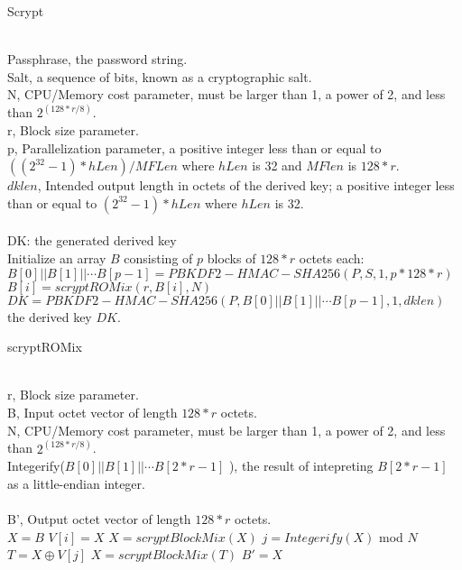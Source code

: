 \begin{algorithm}[tbp]\footnotesize
\caption{Scrypt}
\label{Scrypt}
  	\begin{algorithmic}[1]
	    \REQUIRE ~~\\ 
	    Passphrase, the password string.\\
		Salt, a sequence of bits, known as a cryptographic salt.\\
		N, CPU/Memory cost parameter, must be larger than 1, a power of 2,
		 and less than $2^{(128 * r / 8)}$.\\
		r, Block size parameter.\\
		p, Parallelization parameter, a positive integer less than or equal 
		to $((2^{32}-1) * hLen) / MFLen$ where $hLen$ is 32 and $MFlen$ is $128 * r$.\\
		$dklen$, Intended output length in octets of the derived key; 
		a positive integer less than or equal to $(2^{32} - 1) * hLen$ where $hLen$ is 32.\\
	    \ENSURE ~~\\
	    DK: the generated derived key\\
	    \STATE Initialize an array $B$ consisting of $p$ blocks of $128 * r$ octets each:\\
			$B[0]||B[1]||\cdots B[p-1]=PBKDF2-HMAC-SHA256(P,S,1,p*128*r)$
			\STATE $B[i]= scryptROMix(r,B[i],N)$   
		\ENDFOR 
		\STATE $DK=PBKDF2-HMAC-SHA256(P,B[0]||B[1]||\cdots B[p-1],1,dklen)$
		\RETURN the derived key $DK$.		
    \end{algorithmic}
\end{algorithm}
 
\begin{algorithm}[tbp]\footnotesize
\caption{scryptROMix}
\label{scryptROMix}
  	\begin{algorithmic}[1]
	    \REQUIRE ~~\\ 
	    r, Block size parameter.\\
		B, Input octet vector of length $128 * r$ octets.\\
		N, CPU/Memory cost parameter, must be larger than 1,
		 a power of 2, and less than $2^{(128 * r / 8)}$.\\
		Integerify($B[0]||B[1]||\cdots B[2*r-1]$ ), 
		the result of intepreting $B[2*r-1]$ as a little-endian integer.\\
	    \ENSURE ~~\\
	    B', Output octet vector of length $128 * r$ octets.\\
	    \STATE $X = B$
			\STATE $V[i]=X$  
			\STATE $X=scryptBlockMix(X)$  
 		\ENDFOR 
			\STATE $j=Integerify(X)$ mod $N$  
			\STATE $T=X \oplus V[j]$  
			\STATE $X=scryptBlockMix(T)$  
		\ENDFOR
		\RETURN $B'=X$	
    \end{algorithmic}
\end{algorithm}


